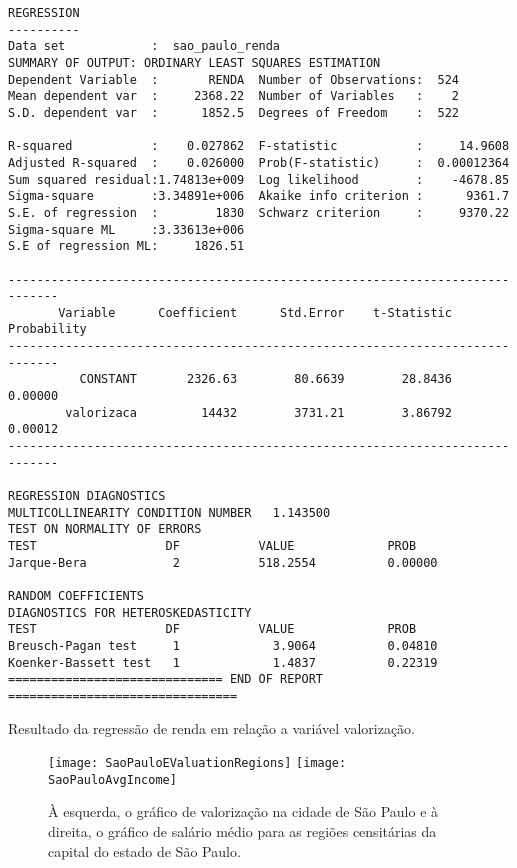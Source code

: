 \begin{table}
\begin{lstlisting}[basicstyle={\scriptsize},tabsize=4]
REGRESSION
----------
Data set            :  sao_paulo_renda
SUMMARY OF OUTPUT: ORDINARY LEAST SQUARES ESTIMATION
Dependent Variable  :       RENDA  Number of Observations:  524
Mean dependent var  :     2368.22  Number of Variables   :    2
S.D. dependent var  :      1852.5  Degrees of Freedom    :  522 

R-squared           :    0.027862  F-statistic           :     14.9608
Adjusted R-squared  :    0.026000  Prob(F-statistic)     :  0.00012364
Sum squared residual:1.74813e+009  Log likelihood        :    -4678.85
Sigma-square        :3.34891e+006  Akaike info criterion :      9361.7
S.E. of regression  :        1830  Schwarz criterion     :     9370.22
Sigma-square ML     :3.33613e+006
S.E of regression ML:     1826.51

-----------------------------------------------------------------------------
       Variable      Coefficient      Std.Error    t-Statistic   Probability
-----------------------------------------------------------------------------
          CONSTANT       2326.63        80.6639        28.8436     0.00000
        valorizaca         14432        3731.21        3.86792     0.00012
-----------------------------------------------------------------------------

REGRESSION DIAGNOSTICS  
MULTICOLLINEARITY CONDITION NUMBER   1.143500
TEST ON NORMALITY OF ERRORS
TEST                  DF           VALUE             PROB
Jarque-Bera            2           518.2554          0.00000

RANDOM COEFFICIENTS
DIAGNOSTICS FOR HETEROSKEDASTICITY  
TEST                  DF           VALUE             PROB
Breusch-Pagan test     1             3.9064          0.04810
Koenker-Bassett test   1             1.4837          0.22319
============================== END OF REPORT ================================
\end{lstlisting}

\caption{\label{tab:regression_result} Resultado da regressão de renda em relação a variável valorização.}
\end{table}

\begin{center}
\begin{figure}
\begin{centering}
\texttt{[image: SaoPauloEValuationRegions]}
\texttt{[image: SaoPauloAvgIncome]}
\end{centering}
\caption{\label{fig:sao_paulo_stats} À esquerda, o gráfico de valorização na cidade de São Paulo e à direita, o gráfico de salário médio para as regiões censitárias da capital do estado de São Paulo.}
\end{figure}
\end{center}

